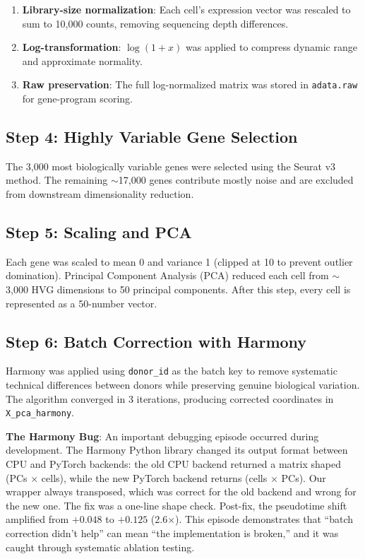 \documentclass[11pt]{article}
\begin{document}
\begin{enumerate}
\item \textbf{Library-size normalization}: Each cell's expression vector was rescaled to sum to 10,000 counts, removing sequencing depth differences.
\item \textbf{Log-transformation}: $\log(1+x)$ was applied to compress dynamic range and approximate normality.
\item \textbf{Raw preservation}: The full log-normalized matrix was stored in \texttt{adata.raw} for gene-program scoring.
\end{enumerate}

\subsection{Step 4: Highly Variable Gene Selection}

The 3,000 most biologically variable genes were selected using the Seurat v3 method. The remaining $\sim$17,000 genes contribute mostly noise and are excluded from downstream dimensionality reduction.

\subsection{Step 5: Scaling and PCA}

Each gene was scaled to mean 0 and variance 1 (clipped at 10 to prevent outlier domination). Principal Component Analysis (PCA) reduced each cell from $\sim$3,000 HVG dimensions to 50 principal components. After this step, every cell is represented as a 50-number vector.

\subsection{Step 6: Batch Correction with Harmony}

Harmony was applied using \texttt{donor\_id} as the batch key to remove systematic technical differences between donors while preserving genuine biological variation. The algorithm converged in 3 iterations, producing corrected coordinates in \texttt{X\_pca\_harmony}.

\textbf{The Harmony Bug}: An important debugging episode occurred during development. The Harmony Python library changed its output format between CPU and PyTorch backends: the old CPU backend returned a matrix shaped (PCs $\times$ cells), while the new PyTorch backend returns (cells $\times$ PCs). Our wrapper always transposed, which was correct for the old backend and wrong for the new one. The fix was a one-line shape check. Post-fix, the pseudotime shift amplified from $+0.048$ to $+0.125$ (2.6$\times$). This episode demonstrates that ``batch correction didn't help'' can mean ``the implementation is broken,'' and it was caught through systematic ablation testing.
\end{document}

